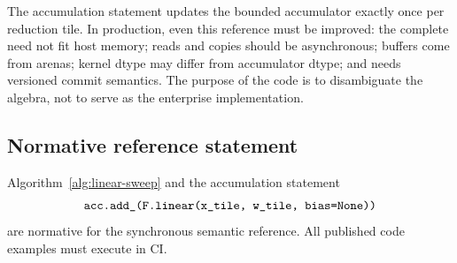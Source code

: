 The accumulation statement updates the bounded accumulator exactly once per reduction tile. In production, even this reference must be improved: the complete  need not fit host memory; reads and copies should be asynchronous; buffers come from arenas; kernel dtype may differ from accumulator dtype; and  needs versioned commit semantics. The purpose of the code is to disambiguate the algebra, not to serve as the enterprise implementation.

\subsection{Normative reference statement}

Algorithm~\ref{alg:linear-sweep} and the accumulation statement
\[
  \texttt{acc.add\_(F.linear(x\_tile, w\_tile, bias=None))}
\]
are normative for the synchronous semantic reference. All published code examples must execute in CI.
